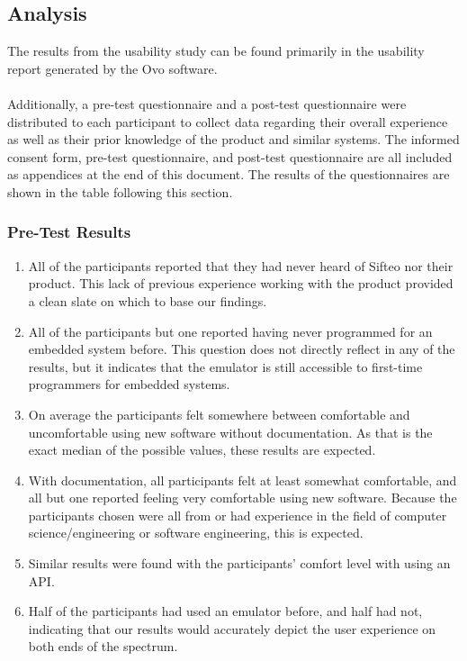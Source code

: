 \documentclass[12pt]{article}
\begin{document}
\subsection{Analysis}
The results from the usability study can be found primarily in the usability report generated by the Ovo software. \\\\
Additionally, a pre-test questionnaire and a post-test questionnaire were distributed to each participant to collect data regarding their overall experience as well as their prior knowledge of the product and similar systems. The informed consent form, pre-test questionnaire, and post-test questionnaire are all included as appendices at the end of this document. The results of the questionnaires are shown in the table following this section.

\subsubsection{Pre-Test Results}
\begin{enumerate}
        \item{All of the participants reported that they had never heard of Sifteo nor their product. This lack of previous experience working with the product provided a clean slate on which to base our findings.}
        \item{All of the participants but one reported having never programmed for an embedded system before. This question does not directly reflect in any of the results, but it indicates that the emulator is still accessible to first-time programmers for embedded systems.}
        \item{On average the participants felt somewhere between comfortable and uncomfortable using new software without documentation.  As  that is the exact median of the possible values, these results are expected.}
        \item{With documentation, all participants felt at least somewhat comfortable, and all but one reported feeling very comfortable using new software. Because the participants chosen were all from or had experience in the field of computer science/engineering or software engineering, this is expected.}
        \item{Similar results were found with the participants' comfort level with using an API.}
        \item{Half of the participants had used an emulator before, and half had not, indicating that our results would accurately depict the user experience on both ends of the spectrum.}
\end{enumerate}
\end{document}
